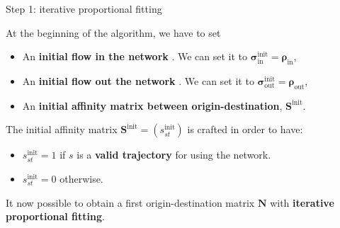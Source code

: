 \documentclass[10pt]{beamer}
\newcommand{\imp}[1]{\textbf{\color{cyan}#1}}
\begin{document}
	
	\begin{frame}{Step 1: iterative proportional fitting}
		
		At the beginning of the algorithm, we have to set 
		\begin{itemize}
			\item An \imp{initial flow in the network }. We can set it to $\bm{\sigma}^\text{init}_\text{in} = \bm{\rho}_\text{in}$,
			\item An \imp{initial flow out the network }. We can set it to $\bm{\sigma}^\text{init}_\text{out} = \bm{\rho}_\text{out}$,
			\item An \imp{initial affinity matrix between origin-destination}, $\mathbf{S}^\text{init}$.
		\end{itemize}  
	
		The initial affinity matrix $\mathbf{S}^\text{init} = (s^\text{init}_{st})$ is crafted in order to have:
		\begin{itemize}
			\item $s^\text{init}_{st} = 1$ if $s$ is a \imp{valid trajectory} for using the network.
			\item $s^\text{init}_{st} = 0$ otherwise.
		\end{itemize}
		
		It now possible to obtain a first origin-destination matrix $\mathbf{N}$ with \imp{iterative proportional fitting}.
		
	\end{frame}
	
	
\end{document}
